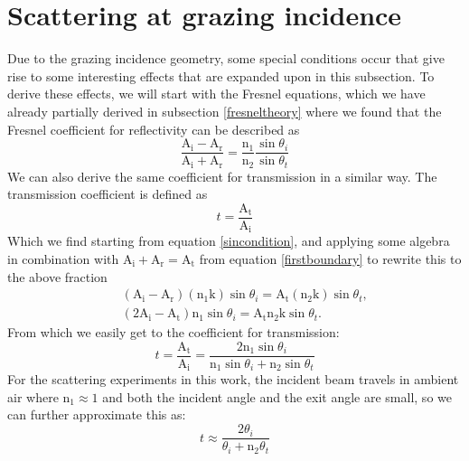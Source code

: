 \section{Scattering at grazing incidence}\label{yoneda_origin}
Due to the grazing incidence geometry, some special conditions occur that give rise to some interesting effects that are expanded upon in this subsection. To derive these effects, we will start with the Fresnel equations, which we have already partially derived in subsection \ref{fresneltheory} where we found that the Fresnel coefficient for reflectivity can be described as
\begin{equation}\label{yoneda_starting_point}
	\frac{\textrm{A}_{\textrm{i}}-\textrm{A}_{\textrm{r}}}{\textrm{A}_{\textrm{i}}+\textrm{A}_{\textrm{r}}} = \frac{\textrm{n}_1}{\textrm{n}_2} \frac{\sin{\theta_i}}{\sin{\theta_t}}
\end{equation}
We can also derive the same coefficient for transmission in a similar way. The transmission coefficient is defined as
\begin{equation}
	t = \frac{\textrm{A}_{\textrm{t}}}{\textrm{A}_{\textrm{i}}}
\end{equation}
Which we find starting from equation \ref{sincondition}, and applying some algebra in combination with $\textrm{A}_{\textrm{i}} + \textrm{A}_{\textrm{r}} = \textrm{A}_{\textrm{t}}$ from equation \ref{firstboundary} to rewrite this to the above fraction
\begin{eqnarray}\label{transmitted_wave_number}
	&&(\textrm{A}_{\textrm{i}} - \textrm{A}_{\textrm{r}})(\textrm{n}_1\textrm{k})\sin{\theta_i} = \textrm{A}_{\textrm{t}}(\textrm{n}_2\textrm{k})\sin{\theta_t}, \\ 
	&&(2\textrm{A}_{\textrm{i}} - \textrm{A}_{\textrm{t}})\textrm{n}_1\sin{\theta_i} = \textrm{A}_{\textrm{t}}\textrm{n}_2\textrm{k}\sin{\theta_t}.
\end{eqnarray}
From which we easily get to the coefficient for transmission:
\begin{equation}\label{transmission_coefficient_angular}
t = \frac{\textrm{A}_{\textrm{t}}}{\textrm{A}_{\textrm{i}}} = \frac{2\textrm{n}_1\sin\theta_i}{\textrm{n}_1 \sin\theta_i + \textrm{n}_2 \sin\theta_t} 
\end{equation}
For the scattering experiments in this work, the incident beam travels in ambient air where n$_1 \approx 1$ and both the incident angle and the exit angle are small, so we can further approximate this as:
\begin{equation}
	t \approx \frac{2\theta_i}{\theta_i + \textrm{n}_2 \theta_t} 
\end{equation}
